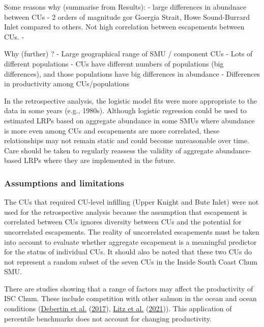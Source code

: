 \documentclass[11pt]{book}
\begin{document}
Some reasons why (summarise from Results): - large differences in abundnace between CUs - 2 orders of magnitude gor Goergia Strait, Howe Sound-Burrard Inlet compared to others. Not high correlation between escapements between CUs. -

Why (further) ? - Large geographical range of SMU / component CUs - Lots of different populations - CUs have different numbers of populations (big differences), and those populations have big differences in abundance - Differences in productivity among CUs/populations

In the retrospective analysis, the logistic model fits were more appropriate to the data in some years (e.g., 1980s). Although logistic regression could be used to estimated LRPs based on aggregate abundance in some SMUs where abundance is more even among CUs and escapements are more correlated, these relationships may not remain static and could become unreasonable over time. Care should be taken to regularly reassess the validity of aggregate abundance-based LRPs where they are implemented in the future.

\hypertarget{assumptions-and-limitations}{%
\subsubsection{Assumptions and limitations}\label{assumptions-and-limitations}}

The CUs that required CU-level infilling (Upper Knight and Bute Inlet) were not used for the retrospective analysis because the assumption that escapement is correlated between CUs ignores diversity between CUs and the potential for uncorrelated escapements. The reality of uncorrelated escapements must be taken into account to evaluate whether aggregate escapement is a meaningful predictor for the status of individual CUs. It should also be noted that these two CUs do not represent a random subset of the seven CUs in the Inside South Coast Chum SMU.

There are studies showing that a range of factors may affect the productivity of ISC Chum. These include competition with other salmon in the ocean and ocean conditions (\protect\hyperlink{ref-debertinMarineGrowthPatterns2017}{Debertin et al.} (\protect\hyperlink{ref-debertinMarineGrowthPatterns2017}{2017}), \protect\hyperlink{ref-litzCompetitionOddyearPink2021}{Litz et al.} (\protect\hyperlink{ref-litzCompetitionOddyearPink2021}{2021})). This application of percentile benchmarks does not account for changing productivity.
\end{document}
